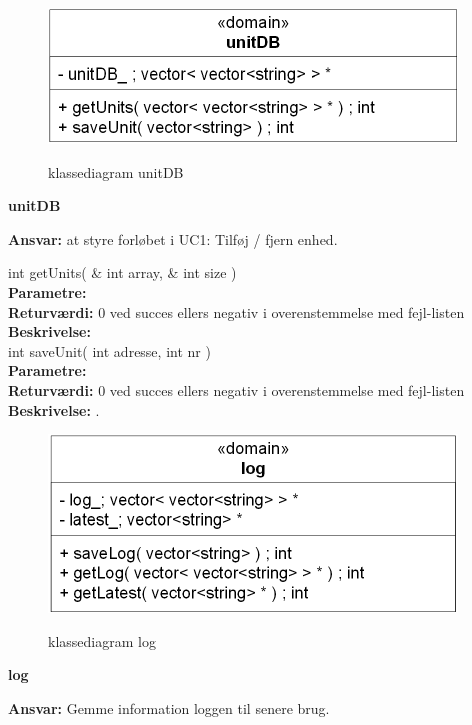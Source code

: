 \newpage

\begin{figure}[htbp] \centering
{\includegraphics[scale=1.5]{filer/design/Klassediagrammer/sw_unitDB}}
\caption{klassediagram unitDB}
\label{fig:unitDB klassediagram}
\end{figure} 

{\centering
\textbf{unitDB}\par
}
\textbf{Ansvar:} at styre forløbet i UC1: Tilføj / fjern enhed. \

int getUnits( \& int array, \& int size ) \\
\textbf{Parametre:}  \\
\textbf{Returværdi:} 0 ved succes ellers negativ i overenstemmelse med fejl-listen \\
\textbf{Beskrivelse:} \\

int saveUnit( int adresse, int nr ) \\
\textbf{Parametre:}  \\
\textbf{Returværdi:} 0 ved succes ellers negativ i overenstemmelse med fejl-listen \\
\textbf{Beskrivelse:} .\\

\begin{figure}[htbp] \centering
{\includegraphics[scale=1.5]{filer/design/Klassediagrammer/sw_log}}
\caption{klassediagram log}
\label{fig:log klassediagram}
\end{figure} 

{\centering
\textbf{log}\par
}
\textbf{Ansvar:} Gemme information loggen til senere brug. \

